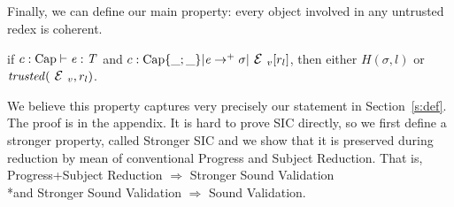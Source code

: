 ${}_{}$

\noindent Finally, we can define our main property: every object involved in any untrusted redex
is coherent.

\begin{Theorem}
if $c:\text{Cap}\vdash {\ensuremath{\mathit{e}}}: {\mathit{T}}$ and
$c:\text{Cap}\{\_;\_\}|\e\rightarrow^+ \sigma|\ctx_v[r_l]$, then
either $H(\sigma,l)$ or $\mathit{trusted}(\ctx_v,r_l)$.
\end{Theorem}

We believe this property captures very precisely our statement in Section~\ref{s:def}.
The proof is in the appendix. It is hard to prove SIC directly,
so we first define a stronger property,
called Stronger SIC and
we show that it is preserved during reduction by mean of conventional Progress and Subject Reduction.
That is,
Progress+Subject Reduction $\Rightarrow$ Stronger Sound Validation
\\*and Stronger Sound Validation $\Rightarrow$ Sound Validation.